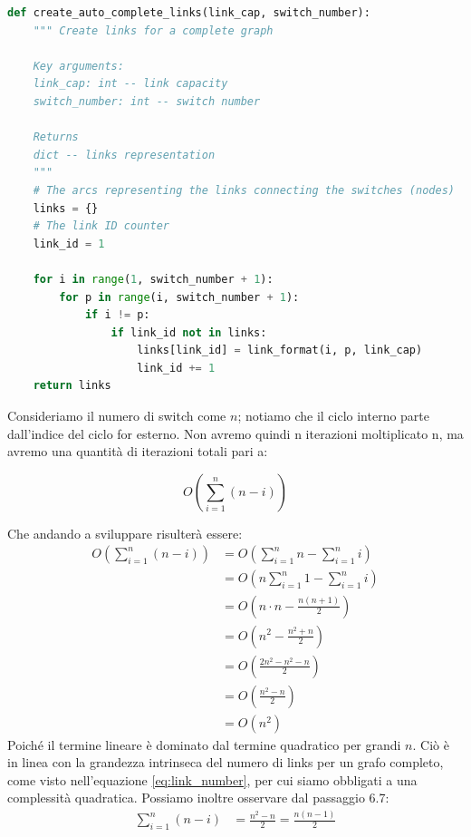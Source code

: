 \documentclass[binding=0.6cm]{sapthesis}
\begin{document}
{\scriptsize %
\begin{lstlisting}[language=Python, basicstyle=\ttfamily, caption={Funzione per la creazione automatica di un grafo di rete completo}, label={codice:create_auto_complete_links}]
    def create_auto_complete_links(link_cap, switch_number):
    """ Create links for a complete graph 
    
    Key arguments:
    link_cap: int -- link capacity
    switch_number: int -- switch number

    Returns
    dict -- links representation
    """
    # The arcs representing the links connecting the switches (nodes)
    links = {}
    # The link ID counter
    link_id = 1

    for i in range(1, switch_number + 1):
        for p in range(i, switch_number + 1):
            if i != p:
                if link_id not in links:
                    links[link_id] = link_format(i, p, link_cap)
                    link_id += 1
    return links
\end{lstlisting}
} %

Consideriamo il numero di switch come \(n\); notiamo che il ciclo interno parte dall'indice del ciclo for esterno. 
Non avremo quindi n iterazioni moltiplicato n,
ma avremo una quantità di iterazioni totali pari a:

\begin{equation}
    O\left(\sum_{i=1}^n (n-i)\right)
\end{equation}

Che andando a sviluppare risulterà essere:
\begin{align}
    O\left(\sum_{i=1}^n (n-i)\right) &= O\left(\sum_{i=1}^n n - \sum_{i=1}^n i\right) \\
    &= O\left(n\sum_{i=1}^n 1 - \sum_{i=1}^n i\right) \\
    &= O\left(n \cdot n - \frac{n(n+1)}{2}\right) \\
    &= O\left(n^2 - \frac{n^2 + n}{2}\right) \\
    &= O\left(\frac{2n^2 - n^2 - n}{2}\right) \\
    &= O\left(\frac{n^2 - n}{2}\right) \\
    &= O(n^2) \quad
    \end{align}
Poiché il termine lineare è dominato dal termine quadratico per grandi \( n \). Ciò è in linea con la grandezza intrinseca del numero di links
per un grafo completo, come visto nell'equazione \ref{eq:link_number}, per cui siamo obbligati a una complessità quadratica.
Possiamo inoltre osservare dal passaggio 6.7:
\begin{align*}
    \sum_{i=1}^n (n-i) &= \frac{n^2 - n}{2} = \frac{n(n-1)}{2}
\end{align*}
    
\end{document}
